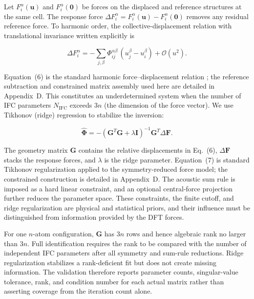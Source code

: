 \documentclass[aps,prb,reprint,amsmath,amssymb,floatfix]{revtex4-2}
\begin{document}
\color{revisionblue}
Let \(F_i^\alpha(\mathbf u)\) and \(F_i^\alpha(\mathbf0)\) be forces on the
displaced and reference structures at the same cell. The response force
\(\Delta F_i^\alpha=F_i^\alpha(\mathbf u)-F_i^\alpha(\mathbf0)\) removes any
residual reference force. To harmonic order, the collective-displacement
relation with translational invariance written explicitly is
\color{black}

\color{revisionblue}
\begin{equation}
\Delta F_i^\alpha = -\sum_{j,\beta}
\Phi_{ij}^{\alpha\beta}\,(u_j^\beta-u_i^\beta)
+\mathcal O(u^2).
\end{equation}
\color{black}

\color{revisionblue}
Equation~(6) is the standard harmonic force--displacement relation
\cite{ref13}; the reference subtraction and constrained matrix assembly used
here are detailed in Appendix~D.
This constitutes an underdetermined system when the number of IFC
parameters \(N_\text{IFC}\) exceeds \(3n\) (the dimension of the force
vector). We use Tikhonov (ridge) regression to stabilize the inversion:
\color{black}

\color{revisionblue}
\begin{equation}
\hat{\boldsymbol{\Phi}} = -\left(\mathbf{G}^T\mathbf{G} + \lambda\mathbf{I}\right)^{-1} \mathbf{G}^T \Delta\mathbf{F}.
\end{equation}
\color{black}

\color{revisionblue}
The geometry matrix \(\mathbf G\) contains the relative displacements in
Eq.~(6), \(\Delta\mathbf F\) stacks the response forces, and \(\lambda\) is the
ridge parameter. Equation~(7) is standard Tikhonov regularization applied to
the symmetry-reduced force model; the constrained construction is detailed in
Appendix~D. The acoustic sum rule is imposed as a hard linear constraint, and
an optional central-force projection further reduces the parameter space.
These constraints, the finite cutoff, and ridge regularization are physical and
statistical priors, and their influence must be distinguished from information
provided by the DFT forces.
\color{black}

\color{revisionblue}
For one \(n\)-atom configuration, \(\mathbf G\) has \(3n\) rows and hence
algebraic rank no larger than \(3n\). Full identification requires the rank to
be compared with the number of independent IFC parameters after all symmetry
and sum-rule reductions. Ridge regularization stabilizes a rank-deficient fit
but does not create missing information. The validation therefore reports parameter counts, singular-value tolerance, rank, and condition number
for each actual matrix rather than asserting coverage from the iteration count
alone.
\color{black}
\end{document}
